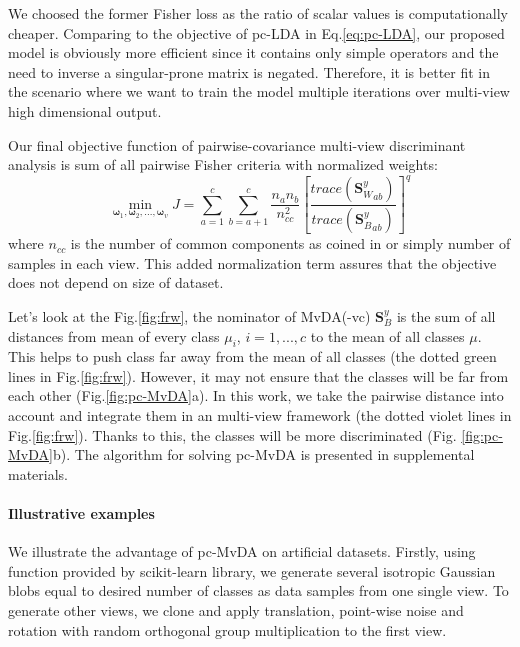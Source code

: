         We choosed the former Fisher loss as the ratio of scalar values is computationally cheaper. Comparing to the objective of pc-LDA in Eq.\eqref{eq:pc-LDA}, our proposed model is obviously more efficient since it contains only simple operators and the need to inverse a singular-prone matrix is negated. Therefore, it is better fit in the scenario where we want to train the model multiple iterations over multi-view high dimensional output.

        Our final objective function of pairwise-covariance multi-view discriminant analysis is sum of all pairwise Fisher criteria with normalized weights:
        \begin{equation}
            \operatorname*{min}_{\boldsymbol{\omega}_1, \boldsymbol{\omega}_2,..., \boldsymbol{\omega}_v}{J}=\sum_{a=1}^{c}\sum_{b=a+1}^{c}{\frac{n_an_b}{n_{cc}^2}{\left[{\frac{trace\left({\boldsymbol{S}_W^y}_{ab}\right)}{trace\left({\boldsymbol{S}_B^y}_{ab}\right)}}\right]}^{q}}
            \label{eq:pc-MvDA}
        \end{equation}
        where $n_{cc}$ is the number of common components as coined in \cite{you2019multi} or simply number of samples in each view. This added normalization term assures that the objective does not depend on size of dataset.

        Let's look at the Fig.\ref{fig:frw}, the nominator of MvDA(-vc) $\boldsymbol{S}_B^y$ is the sum of all distances from mean of every class $\mu_i$, $i = {1,...,c}$ to the mean of all classes $\mu$. This helps to push class far away from the mean of all classes (the dotted green lines in Fig.\ref{fig:frw}). However, it may not ensure that the classes will be far from each other (Fig.\ref{fig:pc-MvDA}a). In this work, we take the pairwise distance into account and integrate them in an multi-view framework (the dotted violet lines in Fig.\ref{fig:frw}). Thanks to this, the classes will be more discriminated (Fig. \ref{fig:pc-MvDA}b). The algorithm for solving pc-MvDA is presented in supplemental materials. 

    \paragraph{Illustrative examples}
        We illustrate the advantage of pc-MvDA on artificial datasets. Firstly, using function provided by scikit-learn library, we generate several isotropic Gaussian blobs equal to desired number of classes as data samples from one single view. To generate other views, we clone and apply translation, point-wise noise and rotation with random orthogonal group multiplication to the first view.

